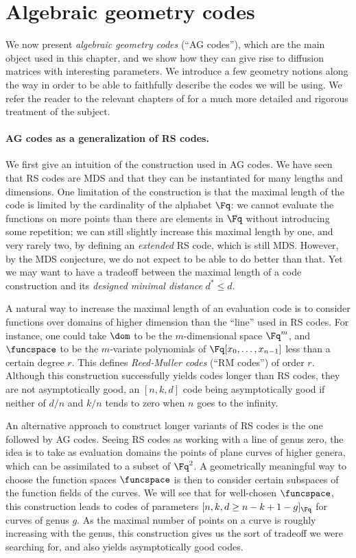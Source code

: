 \section{Algebraic geometry codes}
\label{sec:ag}

We now present \emph{algebraic geometry codes} (``AG codes''), which are the main object used in this chapter,
and we show how they can give rise to diffusion matrices with interesting parameters.
We introduce a few geometry notions along the way in order to be able to faithfully describe the codes we will
be using. 
We refer the reader to the relevant chapters of \cite{vanlint,tvn,stichtenoth,fulton} for a much more detailed and rigorous treatment of the subject. 

\paragraph{AG codes as a generalization of RS codes.}
We first give an intuition of the construction used in AG codes. We have seen that RS codes are MDS
and that they can be instantiated for many lengths and dimensions. One limitation of the construction
is that the maximal length of the code is limited by the cardinality of the alphabet $\Fq$: we
cannot evaluate the functions on more points than there are elements in $\Fq$ without introducing some
repetition; we can still slightly increase this maximal length by one, and very rarely two, by defining an \emph{extended} RS code, which is still MDS.
However, by the MDS
conjecture, we do not expect to be able to do better than that.
Yet we may want to
have a tradeoff between the maximal length of a code construction and its \emph{designed minimal distance} $d^* \leq d$.

A natural way to increase the maximal length of an evaluation code is to consider functions over domains
of higher dimension than the ``line'' used in RS codes. For instance, one could take $\dom$ to be the
$m$-dimensional space $\Fq^m$, and $\funcspace$ to be the $m$-variate polynomials of $\Fq[x_0,\ldots,x_{n-1}]$
less than a certain degree $r$. This defines \emph{Reed-Muller codes} (``RM codes'') of order $r$.
Although this construction successfully yields codes longer than RS codes, they are not asymptotically good, an
$[n, k, d]$ code being asymptotically good if neither of $d/n$ and $k/n$ tends to zero when $n$ goes to the infinity.

An alternative approach to construct longer variants of RS codes is the one followed by AG codes. Seeing
RS codes as working with a line of genus zero, the idea is to take as evaluation domains
the points of plane curves of higher genera,
which can be assimilated to a subset of $\Fq^2$. A geometrically
meaningful way to choose the function spaces $\funcspace$ is then to consider certain subspaces of
the function fields of the curves. We will see that for well-chosen $\funcspace$, this construction
leads to codes of parameters $[n, k, d \geq n - k + 1 - g]_{\Fq}$ for curves of genus $g$. As the
maximal number of points on a curve is roughly increasing with the genus, this construction gives us the
sort of tradeoff we were searching for, and also yields asymptotically good codes.

